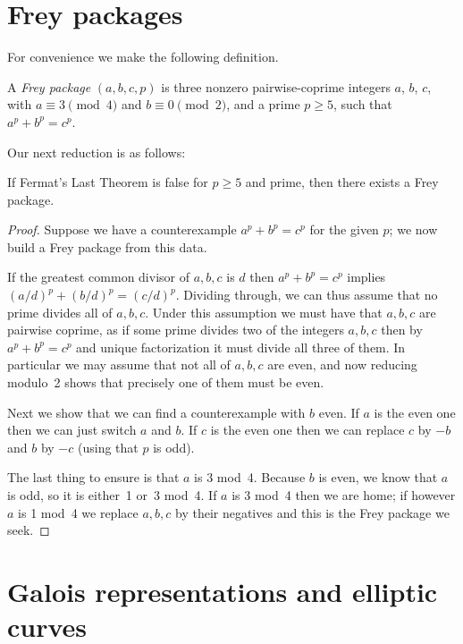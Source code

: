 \section{Frey packages}

For convenience we make the following definition.

\begin{definition}\label{FreyPackage}\leanok A \emph{Frey package} $(a,b,c,p)$
is three nonzero pairwise-coprime integers $a$, $b$, $c$, with $a\equiv3\pmod4$ and $b\equiv0\pmod2$,
and a prime $p\geq5$, such that $a^p+b^p=c^p$.\end{definition}

Our next reduction is as follows:

\begin{lemma}
  \label{FreyPackage.of_not_FermatLastTheorem_p_ge_5}
  \leanok
  If Fermat's Last Theorem is false for $p \ge 5$ and prime, then there exists a Frey package.
\end{lemma}
\begin{proof}
  \leanok
  Suppose we have a counterexample $a^p+b^p=c^p$ for the given $p$; we now build a Frey package from this data.

  If the greatest common divisor of $a,b,c$ is $d$ then $a^p+b^p=c^p$ implies $(a/d)^p+(b/d)^p=(c/d)^p$.
  Dividing through, we can thus assume that no prime divides all of $a,b,c$. Under this assumption we
  must have that $a,b,c$ are pairwise coprime, as if some prime divides two of the integers $a,b,c$
  then by $a^p+b^p=c^p$ and unique factorization it must divide all three of them.
  In particular we may assume that not all of $a,b,c$ are even, and now reducing modulo~2 shows
  that precisely one of them must be even.

  Next we show that we can find a counterexample with $b$ even. If $a$ is the even one then we can
  just switch $a$ and $b$. If $c$ is the even one then we can replace $c$ by $-b$ and $b$ by $-c$
  (using that $p$ is odd).

  The last thing to ensure is that $a$ is 3 mod~4. Because $b$ is even, we know that $a$ is odd,
  so it is either~1 or~3 mod~4. If $a$ is 3 mod~4 then we are home; if however $a$ is 1 mod~4 we
  replace $a,b,c$ by their negatives and this is the Frey package we seek.
\end{proof}

\section{Galois representations and elliptic curves}\label{twopointfour}

